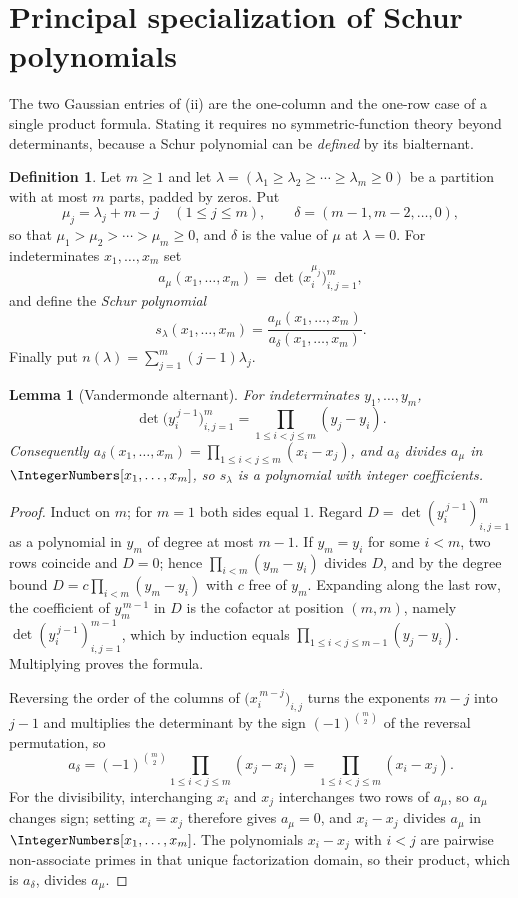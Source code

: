 \documentclass[11pt,a4paper,oneside,openany]{book}
\newtheorem{lemma}[lemma]{Lemma}
\theoremstyle{definition}
\newtheorem{definition}[definition]{Definition}
\theoremstyle{remark}
\begin{document}
\section{Principal specialization of Schur polynomials}

The two Gaussian entries of (ii) are the
one-column and the one-row case of a single product formula.  Stating it
requires no symmetric-function theory beyond determinants, because a Schur
polynomial can be \emph{defined} by its bialternant.

\begin{definition}\label{def:schur-bialternant}
Let $m\ge1$ and let $\lambda=(\lambda_1\ge\lambda_2\ge\cdots\ge\lambda_m\ge0)$
be a partition with at most $m$ parts, padded by zeros.  Put
\[
 \mu_j=\lambda_j+m-j\quad(1\le j\le m),
 \qquad
 \delta=(m-1,m-2,\ldots,0),
\]
so that $\mu_1>\mu_2>\cdots>\mu_m\ge0$, and $\delta$ is the value of $\mu$ at
$\lambda=0$.  For indeterminates $x_1,\ldots,x_m$ set
\[
 a_\mu(x_1,\ldots,x_m)=\det\bigl(x_i^{\mu_j}\bigr)_{i,j=1}^{m},
\]
and define the \emph{Schur polynomial}
\[
 s_\lambda(x_1,\ldots,x_m)
 =\frac{a_\mu(x_1,\ldots,x_m)}{a_\delta(x_1,\ldots,x_m)}.
\]
Finally put $n(\lambda)=\sum_{j=1}^{m}(j-1)\lambda_j$.
\end{definition}

\begin{lemma}[Vandermonde alternant]\label{lem:vandermonde-alternant}
For indeterminates $y_1,\ldots,y_m$,
\[
 \det\bigl(y_i^{\,j-1}\bigr)_{i,j=1}^{m}
 =\prod_{1\le i<j\le m}(y_j-y_i).
\]
Consequently $a_\delta(x_1,\ldots,x_m)=\prod_{1\le i<j\le m}(x_i-x_j)$, and
$a_\delta$ divides $a_\mu$ in $\IntegerNumbers[x_1,\ldots,x_m]$, so $s_\lambda$ is a
polynomial with integer coefficients.
\end{lemma}

\begin{proof}
Induct on $m$; for $m=1$ both sides equal $1$.  Regard
$D=\det(y_i^{\,j-1})_{i,j=1}^{m}$ as a polynomial in $y_m$ of degree at most
$m-1$.  If $y_m=y_i$ for some $i<m$, two rows coincide and $D=0$; hence
$\prod_{i<m}(y_m-y_i)$ divides $D$, and by the degree bound
$D=c\prod_{i<m}(y_m-y_i)$ with $c$ free of $y_m$.  Expanding along the last
row, the coefficient of $y_m^{\,m-1}$ in $D$ is the cofactor at position
$(m,m)$, namely $\det(y_i^{\,j-1})_{i,j=1}^{m-1}$, which by induction equals
$\prod_{1\le i<j\le m-1}(y_j-y_i)$.  Multiplying proves the formula.

Reversing the order of the columns of $\bigl(x_i^{\,m-j}\bigr)_{i,j}$ turns
the exponents $m-j$ into $j-1$ and multiplies the determinant by the sign
$(-1)^{\binom m2}$ of the reversal permutation, so
\[
 a_\delta=(-1)^{\binom m2}\prod_{1\le i<j\le m}(x_j-x_i)
 =\prod_{1\le i<j\le m}(x_i-x_j).
\]
For the divisibility, interchanging $x_i$ and $x_j$ interchanges two rows of
$a_\mu$, so $a_\mu$ changes sign; setting $x_i=x_j$ therefore gives
$a_\mu=0$, and $x_i-x_j$ divides $a_\mu$ in $\IntegerNumbers[x_1,\ldots,x_m]$.  The
polynomials $x_i-x_j$ with $i<j$ are pairwise non-associate primes in that
unique factorization domain, so their product, which is $a_\delta$, divides
$a_\mu$.
\end{proof}
\end{document}
